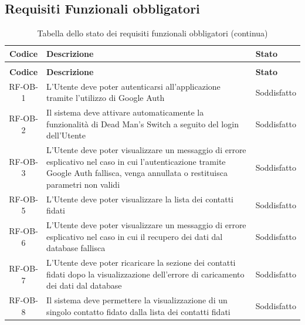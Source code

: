 \documentclass[a4paper,12pt]{article}
\begin{document}
\subsection{Requisiti Funzionali obbligatori} \label{subsection:requisiti_funzionali_obbligatori}
\begin{center}
\renewcommand{\arraystretch}{1.5}

\begin{longtable}{|c|p{8.5cm}|>{\centering\arraybackslash}p{4cm}|}

\hline
\rowcolor{gray!60}
\textbf{Codice} & \textbf{Descrizione} & \textbf{Stato} \\
\hline
\endfirsthead
\caption[]{Tabella dello stato dei requisiti funzionali obbligatori (continua)} \\
\hline
\rowcolor{gray!60}
\textbf{Codice} & \textbf{Descrizione} & \textbf{Stato} \\
\hline
\endhead

RF-OB-1 & L'Utente deve poter autenticarsi all'applicazione tramite l'utilizzo di Google Auth & Soddisfatto \\
\hline

RF-OB-2 & Il sistema deve attivare automaticamente la funzionalità di Dead Man's Switch a seguito del login dell'Utente & Soddisfatto \\
\hline

RF-OB-3 & L'Utente deve poter visualizzare un messaggio di errore esplicativo nel caso in cui l'autenticazione tramite Google Auth fallisca, venga annullata o restituisca parametri non validi & Soddisfatto \\
\hline

RF-OB-5 & L'Utente deve poter visualizzare la lista dei contatti fidati & Soddisfatto \\
\hline

RF-OB-6 & L'Utente deve poter visualizzare un messaggio di errore esplicativo nel caso in cui il recupero dei dati dal database fallisca & Soddisfatto \\
\hline

RF-OB-7 & L'Utente deve poter ricaricare la sezione dei contatti fidati dopo la visualizzazione dell'errore di caricamento dei dati dal database & Soddisfatto \\
\hline

RF-OB-8 & Il sistema deve permettere la visualizzazione di un singolo contatto fidato dalla lista dei contatti fidati & Soddisfatto \\
\hline


\end{longtable}
\end{center}
\end{document}
